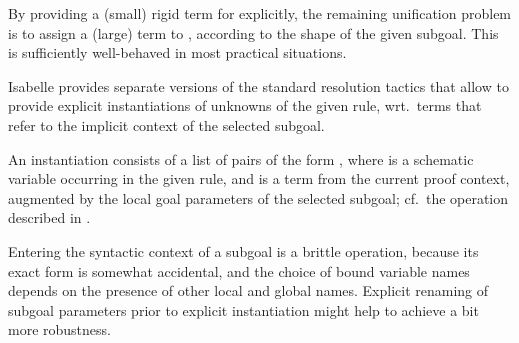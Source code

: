 \begin{isabellebody}
\begin{isamarkuptext}
  By providing a (small) rigid term for  explicitly, the
  remaining unification problem is to assign a (large) term to , according to the shape of the given subgoal.  This is
  sufficiently well-behaved in most practical situations.

  \medskip Isabelle provides separate versions of the standard  resolution tactics that allow to provide explicit
  instantiations of unknowns of the given rule, wrt.\ terms that refer
  to the implicit context of the selected subgoal.

  An instantiation consists of a list of pairs of the form , where  is a schematic variable occurring in
  the given rule, and  is a term from the current proof
  context, augmented by the local goal parameters of the selected
  subgoal; cf.\ the  operation described in
  .

  Entering the syntactic context of a subgoal is a brittle operation,
  because its exact form is somewhat accidental, and the choice of
  bound variable names depends on the presence of other local and
  global names.  Explicit renaming of subgoal parameters prior to
  explicit instantiation might help to achieve a bit more robustness.


\end{isamarkuptext}
\end{isabellebody}
